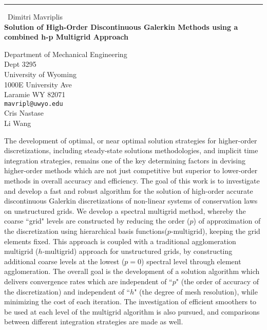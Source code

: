 \documentclass{report}
\begin{document}
\begin{center}
\rule{6in}{1pt} \
{\large Dimitri Mavriplis \\
{\bf Solution of High-Order Discontinuous Galerkin Methods using a combined h-p Multigrid Approach}}

Department of Mechanical Engineering \\ Dept 3295 \\ University of Wyoming \\ 1000E University Ave \\ Laramie WY 82071
\\
{\tt mavripl@uwyo.edu}\\
Cris Nastase\\
Li Wang\end{center}

The development of optimal, or near optimal solution strategies for
higher-order discretizations, including steady-state solutions
methodologies, and implicit time integration strategies,
remains one of the key determining factors in devising higher-order
methods which are not just competitive but superior to lower-order
methods in overall accuracy and efficiency. The goal of this work is to
investigate and develop a fast and robust algorithm for the solution of
high-order accurate discontinuous Galerkin discretizations of non-linear
systems of conservation laws on unstructured grids.
We develop a spectral multigrid method, whereby the coarse
``grid" levels are constructed by reducing the order ($p$)
of approximation of the discretization using hierarchical basis
functions($p$-multigrid), keeping the grid elements fixed.
This approach is coupled with a traditional agglomeration multigrid
($h$-multigrid) approach for unstructured grids, by constructing
additional coarse levels at the lowest ($p=0$) spectral level through
element agglomeration. The overall goal is the
development of a solution algorithm which delivers convergence rates
which are independent of ``$p$" (the order of accuracy of the
discretization) and independent of ``$h$" (the degree of mesh
resolution), while minimizing the cost of each iteration.
The investigation of efficient smoothers to be used at each
level of the multigrid algorithm is also pursued, and comparisons
between different integration strategies are made as well.
\end{document}
